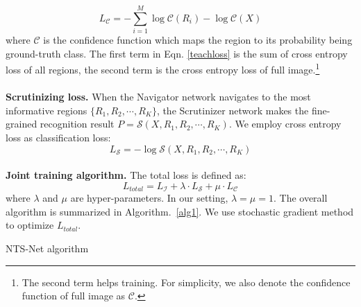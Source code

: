 \documentclass[runningheads]{llncs}
\begin{document}
\begin{equation}\label{teachloss}
	L_{\mathcal C} = -\sum_{i=1}^M\log \mathcal C(R_i) - \log \mathcal C(X)
\end{equation}
where $\mathcal C$ is the confidence function which maps the region to its probability being ground-truth class. The first term in Eqn. \ref{teachloss} is the sum of cross entropy loss of all regions, the second term is the cross entropy loss of full image.\footnote{The second term helps training. For simplicity, we also denote the confidence function of full image as $\mathcal C$. }\\\\
\textbf{Scrutinizing loss.}
When the Navigator network navigates to the most informative regions $\{R_1, R_2, \cdots, R_K\}$, the Scrutinizer network makes the fine-grained recognition result $P = \mathcal S(X, R_1, R_2, \cdots, R_K)$. We employ cross entropy loss as classification loss:
\begin{equation}
	L_{\mathcal S} = -\log \mathcal S(X, R_1, R_2, \cdots, R_K)
\end{equation}\\
\textbf{Joint training algorithm.} 
The total loss is defined as:
\begin{equation}\label{total_loss}
	L_{total} = L_{\mathcal I} + \lambda \cdot L_{\mathcal S} + \mu \cdot L_{\mathcal C}
\end{equation}
where $\lambda$ and $\mu$ are hyper-parameters. In our setting, $\lambda = \mu = 1$. The overall algorithm is summarized in Algorithm.~\ref{alg1}. We use stochastic gradient method to optimize $L_{total}$.

\begin{algorithm}
\caption{NTS-Net algorithm}
\label{alg1}
\LinesNumbered
{}
\end{algorithm}
\end{document}
